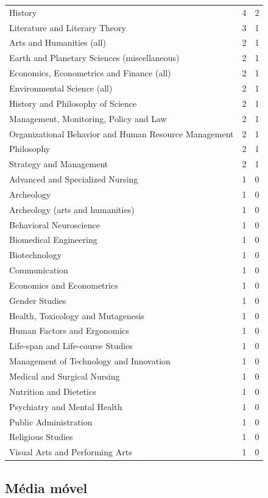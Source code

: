 \documentclass[12pt,brazil]{article}\usepackage[]{graphicx}\usepackage[]{xcolor}
\begin{document}
\begin{longtable}{lrr}
History & 4 & 2 \\
Literature and Literary Theory & 3 & 1 \\
Arts and Humanities (all) & 2 & 1 \\
Earth and Planetary Sciences (miscellaneous) & 2 & 1 \\
Economics, Econometrics and Finance (all) & 2 & 1 \\
Environmental Science (all) & 2 & 1 \\
History and Philosophy of Science & 2 & 1 \\
Management, Monitoring, Policy and Law & 2 & 1 \\
Organizational Behavior and Human Resource Management & 2 & 1 \\
Philosophy & 2 & 1 \\
Strategy and Management & 2 & 1 \\
Advanced and Specialized Nursing & 1 & 0 \\
Archeology & 1 & 0 \\
Archeology (arts and humanities) & 1 & 0 \\
Behavioral Neuroscience & 1 & 0 \\
Biomedical Engineering & 1 & 0 \\
Biotechnology & 1 & 0 \\
Communication & 1 & 0 \\
Economics and Econometrics & 1 & 0 \\
Gender Studies & 1 & 0 \\
Health, Toxicology and Mutagenesis & 1 & 0 \\
Human Factors and Ergonomics & 1 & 0 \\
Life-span and Life-course Studies & 1 & 0 \\
Management of Technology and Innovation & 1 & 0 \\
Medical and Surgical Nursing & 1 & 0 \\
Nutrition and Dietetics & 1 & 0 \\
Psychiatry and Mental Health & 1 & 0 \\
Public Administration & 1 & 0 \\
Religious Studies & 1 & 0 \\
Visual Arts and Performing Arts & 1 & 0 \\
\end{longtable}


\newpage

\subsection{Média móvel}
\end{document}

